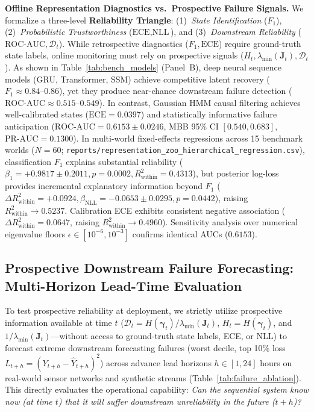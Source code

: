 \documentclass[twoside]{article}
\theoremstyle{definition}
\begin{document}
\textbf{Offline Representation Diagnostics vs.\ Prospective Failure Signals.}
We formalize a three-level \textbf{Reliability Triangle}: (1)~\emph{State Identification} ($F_1$), (2)~\emph{Probabilistic Trustworthiness} ($\text{ECE}, \text{NLL}$), and (3)~\emph{Downstream Reliability} ($\text{ROC-AUC}, \mathcal{D}_t$). While retrospective diagnostics ($F_1, \text{ECE}$) require ground-truth state labels, online monitoring must rely on prospective signals ($H_t, \lambda_{\min}(\boldsymbol{J}_t), \mathcal{D}_t$). As shown in Table~\ref{tab:bench_models} (Panel~B), deep neural sequence models (GRU, Transformer, SSM) achieve competitive latent recovery ($F_1 \approx 0.84\text{--}0.86$), yet they produce near-chance downstream failure detection ($\text{ROC-AUC} \approx 0.515\text{--}0.549$). In contrast, Gaussian HMM causal filtering achieves well-calibrated states ($\text{ECE} = 0.0397$) and statistically informative failure anticipation ($\text{ROC-AUC} = \mathbf{0.6153 \pm 0.0246}$, MBB 95\% CI $[0.540, 0.683]$, $\text{PR-AUC} = 0.1300$). In multi-world fixed-effects regressions across 15 benchmark worlds ($N=60$; \texttt{reports/representation\_zoo\_hierarchical\_regression.csv}), classification $F_1$ explains substantial reliability ($\beta_1 = +0.9817 \pm 0.2011, p = 0.0002, R^2_{\mathrm{within}} = 0.4313$), but posterior log-loss provides incremental explanatory information beyond $F_1$ ($\Delta R^2_{\mathrm{within}} = +0.0924, \beta_{\mathrm{NLL}} = -0.0653 \pm 0.0295, p = 0.0442$), raising $R^2_{\mathrm{within}} \to 0.5237$. Calibration ECE exhibits consistent negative association ($\Delta R^2_{\mathrm{within}} = 0.0647$, raising $R^2_{\mathrm{within}} \to 0.4960$). Sensitivity analysis over numerical eigenvalue floors $\epsilon \in [10^{-6}, 10^{-3}]$ confirms identical AUCs ($0.6153$).

\subsection{Prospective Downstream Failure Forecasting: Multi-Horizon Lead-Time Evaluation}
\label{app:failure_prediction}
To test prospective reliability at deployment, we strictly utilize prospective information available at time $t$ ($\mathcal{D}_t = H(\boldsymbol{\gamma}_t) / \lambda_{\min}(\boldsymbol{J}_t)$, $H_t = H(\boldsymbol{\gamma}_t)$, and $1/\lambda_{\min}(\boldsymbol{J}_t)$—without access to ground-truth state labels, ECE, or NLL) to forecast extreme downstream forecasting failures (worst decile, top 10\% loss $L_{t+h} = (Y_{t+h} - \hat{Y}_{t+h})^2$) across advance lead horizons $h \in [1, 24]$ hours on real-world sensor networks and synthetic streams (Table~\ref{tab:failure_ablation}). This directly evaluates the operational capability: \emph{Can the sequential system know now (at time $t$) that it will suffer downstream unreliability in the future ($t+h$)?}
\end{document}
